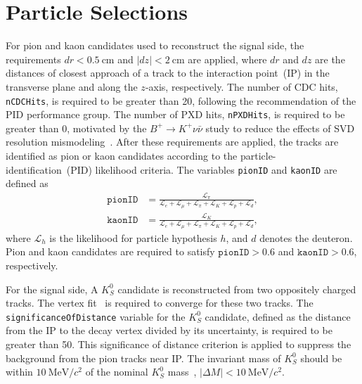\section{Particle Selections}
\label{sec:particle_selection}
For pion and kaon candidates used to reconstruct the signal side, the requirements $dr < 0.5~\textrm{cm}$ and $\left|dz\right| < 2~\textrm{cm}$ are applied, where $dr$ and $dz$ are the distances of closest approach of a track to the interaction point~(IP) in the transverse plane and along the $z$-axis, respectively.
The number of CDC hits, \texttt{nCDCHits}, is required to be greater than 20, following the recommendation of the PID performance group.
The number of PXD hits, \texttt{nPXDHits}, is required to be greater than 0, motivated by the $B^{+}\rightarrow K^{+}\nu\bar{\nu}$ study to reduce the effects of SVD resolution mismodeling~\cite{Belle-II:2021rof}.
After these requirements are applied, the tracks are identified as pion or kaon candidates according to the particle-identification~(PID) likelihood criteria.
The variables \texttt{pionID} and \texttt{kaonID} are defined as
\begin{equation}
\begin{aligned}
    \texttt{pionID} &=
    \frac{\mathcal{L}_{\pi}}
    {\mathcal{L}_{e}+\mathcal{L}_{\mu}+\mathcal{L}_{\pi}
    +\mathcal{L}_{K}+\mathcal{L}_{p}+\mathcal{L}_{d}},\\
    \texttt{kaonID} &=
    \frac{\mathcal{L}_{K}}
    {\mathcal{L}_{e}+\mathcal{L}_{\mu}+\mathcal{L}_{\pi}
    +\mathcal{L}_{K}+\mathcal{L}_{p}+\mathcal{L}_{d}},
\end{aligned}
\end{equation}
where $\mathcal{L}_{h}$ is the likelihood for particle hypothesis $h$, and $d$ denotes the deuteron.
Pion and kaon candidates are required to satisfy $\texttt{pionID}>0.6$ and $\texttt{kaonID}>0.6$, respectively.

For the signal side, A $K_S^0$ candidate is reconstructed from two oppositely charged tracks.
The vertex fit~\cite{Krohn:2019dlq} is required to converge for these two tracks.
The \texttt{significance\allowbreak Of\allowbreak Distance} variable for the $K_S^0$ candidate, defined as the distance from the IP to the decay vertex divided by its uncertainty, is required to be greater than 50.
This significance of distance criterion is applied to suppress the background from the pion tracks near IP.
The invariant mass of $K_{S}^{0}$ should be within $10~\textrm{MeV}/c^{2}$ of the nominal $K_{S}^{0}$ mass~\cite{ParticleDataGroup:2024cfk}, $|\Delta M| < 10~\textrm{MeV}/c^{2}$.

